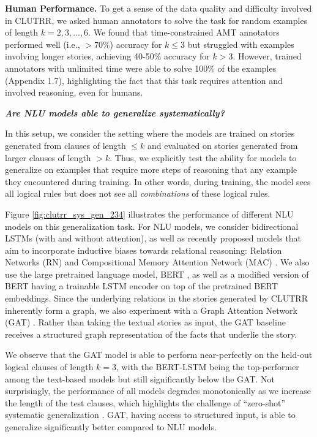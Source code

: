 \documentclass[12pt]{article}
\newcommand{\xit}[1]{{\noindent\textbf{\textit{#1}}}}
\begin{document}
\noindent \textbf{Human Performance.} To get a sense of the data quality and difficulty involved in CLUTRR, we asked human annotators to solve the task for random examples of length $k=2,3,...,6$.
We found that time-constrained AMT annotators performed well (i.e., ${>70\%}$) accuracy for ${k\leq 3}$ but struggled with examples involving longer stories, achieving 40-50\% accuracy for ${k > 3}$. However, trained annotators with unlimited time were able to solve 100\% of the examples (Appendix 1.7), highlighting the fact that this task requires attention and involved reasoning, even for humans.

\xit{Are NLU models able to generalize systematically?}

In this setup, we consider the setting where the models are trained on stories generated from clauses of length ${\leq k}$ and evaluated on stories generated from larger clauses of length ${>k}$. Thus, we explicitly test the ability for models to generalize on examples that require more steps of reasoning that any example they encountered during training.
In other words, during training, the model sees all logical rules but does not see all {\em combinations} of these logical rules.


Figure \ref{fig:clutrr_sys_gen_234} illustrates the performance of different NLU models on this generalization task. For NLU models, we consider bidirectional LSTMs \citep{hochreiter1997long, cho2014learning} (with and without attention), as well as recently proposed models that aim to incorporate inductive biases towards relational reasoning: Relation Networks (RN) \citep{santoro2017simple} and Compositional Memory Attention Network (MAC) \citep{hudson2018compositional}. We also use the large pretrained language model, BERT \cite{devlin2018bert}, as well as a modified version of BERT having a trainable LSTM encoder on top of the pretrained BERT embeddings. Since the underlying relations in the stories generated by CLUTRR inherently form a graph, we also experiment with a Graph Attention Network (GAT) \citep{Velickovic2017-mh}. Rather than taking the textual stories as input, the GAT baseline receives a structured graph representation of the facts that underlie the story.

We observe that the GAT model is able to perform near-perfectly on the held-out logical clauses of length $k=3$, with the BERT-LSTM being the top-performer among the text-based models but still significantly below the GAT.
Not surprisingly, the performance of all models degrades monotonically as we increase the length of the test clauses, which highlights the challenge of ``zero-shot'' systematic generalization \cite{lake2017generalization, 2018arXiv181107017S}.
GAT, having access to structured input, is able to generalize significantly better compared to NLU models.
\end{document}
